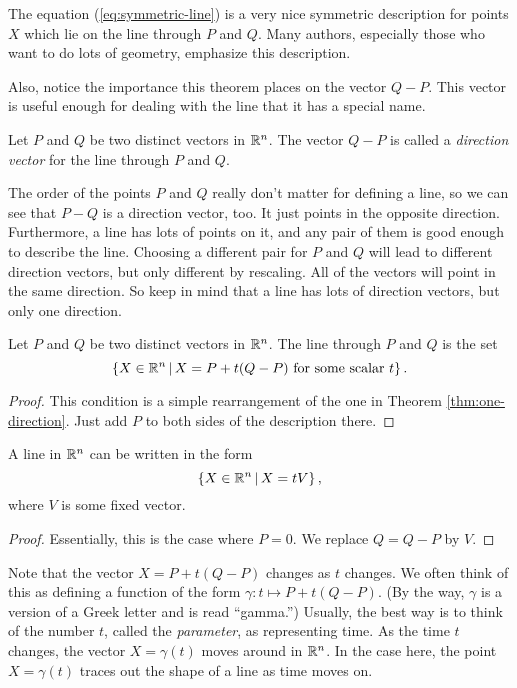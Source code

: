 \documentclass[elementsmain.tex]{subfiles}
\begin{document}
The equation (\ref{eq:symmetric-line}) is a very nice symmetric description 
for points $X$ which lie on the line through $P$ and $Q$. Many authors, especially 
those who want to do lots of geometry, emphasize this description.

Also, notice the importance this theorem places on the vector $Q-P$. This vector is
useful enough for dealing with the line that it has a special name.

\begin{definition}
Let $P$ and $Q$ be two distinct vectors in $\mathbb{R}^n$. The vector $Q-P$ is called a \emph{direction vector} for the line through $P$ and $Q$.
\end{definition}

The order of the points $P$ and $Q$ really don't matter for defining a line, so we can see that $P-Q$ is a direction vector, too. It just points in the opposite direction. Furthermore, a line has lots of points on it, and any pair of them is good enough to 
describe the line. Choosing a different pair for $P$ and $Q$ will lead to different direction vectors, but only different by rescaling. All of the vectors will point in the same direction. So keep in mind that a line has lots of direction vectors, but only one direction.

\begin{corollary}\label{cor:parametric-line}
Let $P$ and $Q$ be two distinct vectors in $\mathbb{R}^n$. The line through $P$ and $Q$ is the set
\[
\left\{ X \in \mathbb{R}^n \,\middle|\, X = P + t(Q-P) \text{ for some scalar $t$}\right\}.
\]
\end{corollary}

\begin{proof}
This condition is a simple rearrangement of the one in Theorem \ref{thm:one-direction}. Just add $P$ to both sides of the description there.
\end{proof}

\begin{corollary}
A line in $\mathbb{R}^n$ can be written in the form
\[
\left\{ X \in \mathbb{R}^n \,\middle|\, X = t V \right\},
\]
where $V$ is some fixed vector.
\end{corollary}

\begin{proof}
Essentially, this is the case where $P=0$. We replace $Q = Q-P$ by $V$.
\end{proof}

Note that the vector $X = P + t(Q-P)$ changes as $t$ changes. We often think of this as
defining a function of the form $\gamma: t \mapsto P + t(Q-P)$. (By the way, $\gamma$ is a version of a Greek letter and is read ``gamma.'') Usually, the best way is
to think of the number $t$, called the \emph{parameter}, as representing time. As the time $t$ changes, the vector $X = \gamma(t)$ moves around in $\mathbb{R}^n$. In the case here, 
the point $X=\gamma(t)$ traces out the shape of a line as time moves on. 
\end{document}
